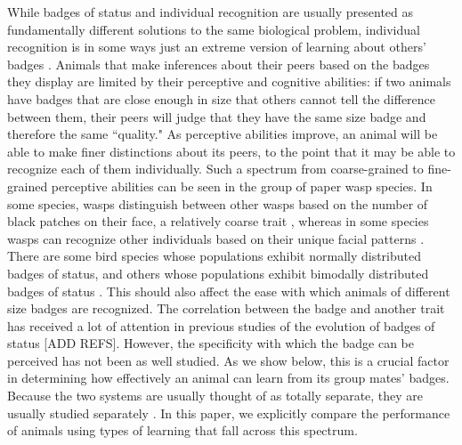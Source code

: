While badges of status and individual recognition are usually presented as fundamentally different solutions to the same biological problem, individual recognition is in some ways just an extreme version of learning about others' badges \cite{Barnard:1979fk}. Animals that make inferences about their peers based on the badges they display are limited by their perceptive and cognitive abilities: if two animals have badges that are close enough in size that others cannot tell the difference between them, their peers will judge that they have the same size badge and therefore the same ``quality." As perceptive abilities improve, an animal will be able to make finer distinctions about its peers, to the point that it may be able to recognize each of them individually. Such a spectrum from coarse-grained to fine-grained perceptive abilities can be seen in the group of paper wasp species. In some species, wasps distinguish between other wasps based on the number of black patches on their face, a relatively coarse trait \cite{Tibbetts:2004kx}, whereas in some species wasps can recognize other individuals based on their unique facial patterns \cite{Tibbetts:2002ys}. There are some bird species whose populations exhibit normally distributed badges of status, and others whose populations exhibit bimodally distributed badges of status \cite{Ripoll:2004vn}. This should also affect the ease with which animals of different size badges are recognized.
The correlation between the badge and another trait has received a lot of attention in previous studies of the evolution of badges of status [ADD REFS]. However, the specificity with which the badge can be perceived has not been as well studied. As we show below, this is a crucial factor in determining how effectively an animal can learn from its group mates' badges. Because the two systems are usually thought of as totally separate, they are usually studied separately \cite{sheehan2016evotradeoff}. In this paper, we explicitly compare the performance of animals using types of learning that fall across this spectrum.


